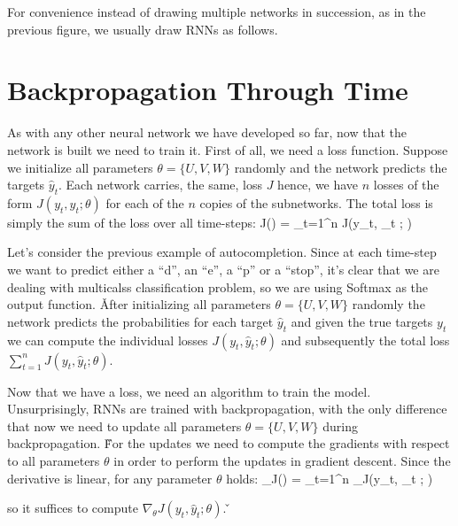 For convenience instead of drawing multiple networks in succession, as in the previous figure, we usually draw RNNs as
follows.

\vspace{-5pt}



\section{Backpropagation Through Time}

As with any other neural network we have developed so far, now that the network is built we need to train it. First of
all, we need a loss function. Suppose we initialize all parameters $\theta = \{U, V, W\}$ randomly and the network
predicts the targets $\hat{y}_t$. Each network carries, the same, loss $J$ hence, we have $n$ losses of the form
$J(y_t, \hat{y}_t ; \theta)$ for each of the $n$ copies of the subnetworks. The total loss is simply the sum of the
loss over all time-steps:
\bse
J(\theta) = \sum_{t=1}^{n} J(y_t, _t ; \theta)
\ese

\be
Let's consider the previous example of autocompletion. Since at each time-step we want to predict either a ``d'', an
``e'', a ``p'' or a ``stop'', it's clear that we are dealing with multicalss classification problem, so we are using
Softmax as the output function. \v

After initializing all parameters $\theta = \{U, V, W\}$ randomly the network predicts the probabilities for each
target $\hat{y}_t$ and given the true targets $y_t$ we can compute the individual losses $J(y_t, \hat{y}_t ; \theta)$
and subsequently the total loss $\sum_{t=1}^{n} J(y_t, \hat{y}_t ; \theta)$.

\ee

Now that we have a loss, we need an algorithm to train the model. Unsurprisingly, RNNs are trained with
backpropagation, with the only difference that now we need to update all parameters $\theta = \{U, V, W\}$ during
backpropagation. \v

For the updates we need to compute the gradients with respect to all parameters $\theta$ in order to perform the
updates in gradient descent. Since the derivative is linear, for any parameter $\theta$ holds:
\bse
\nabla_\theta J(\theta) = \sum_{t=1}^{n} \nabla_\theta J(y_t, _t ; \theta)
\ese

so it suffices to compute $\nabla_\theta J(y_t, \hat{y}_t ; \theta)$. \v

